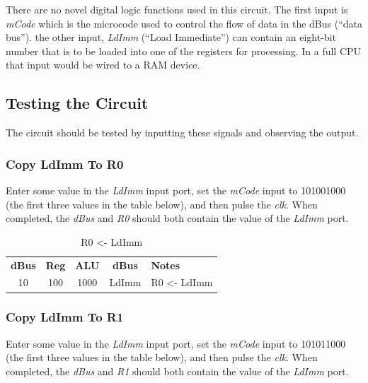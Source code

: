 There are no novel digital logic functions used in this circuit. The first input is \textit{mCode} which is the microcode used to control the flow of data in the dBus (``data bus''). the other input, \textit{LdImm} (``Load Immediate'') can contain an eight-bit number that is to be loaded into one of the registers for processing. In a full \ac{CPU} that input would be wired to a \ac{RAM} device.

\subsection{Testing the Circuit}

The circuit should be tested by inputting these signals and observing the output.

\subsubsection{Copy LdImm To R0}

Enter some value in the \textit{LdImm} input port, set the \textit{mCode} input to 101001000 (the first three values in the table below), and then pulse the \textit{clk}. When completed, the \textit{dBus} and \textit{R0} should both contain the value of the \textit{LdImm} port.

\begin{table}[H]
	\sffamily
	\newcommand{\head}[1]{\textcolor{white}{\textbf{#1}}}		
	\begin{center}
		\begin{tabular}{ccccl} 
			\textbf{dBus} & \textbf{Reg} & \textbf{ALU} & \textbf{dBus} & \textbf{Notes} \\
			10 & 100 & 1000 & LdImm & R0 <- LdImm \\
		\end{tabular}
	\end{center}
	\caption{R0 <- LdImm}
	\label{tab:11-01}
\end{table}

\subsubsection{Copy LdImm To R1}

Enter some value in the \textit{LdImm} input port, set the \textit{mCode} input to 101011000 (the first three values in the table below), and then pulse the \textit{clk}. When completed, the \textit{dBus} and \textit{R1} should both contain the value of the \textit{LdImm} port.

